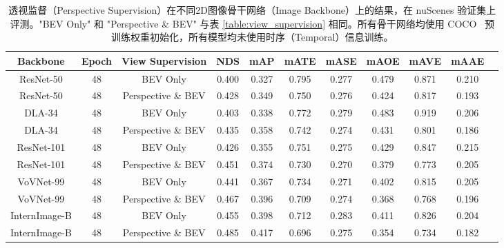 \setlength{\tabcolsep}{3pt}
\setlength{\doublerulesep}{2\arrayrulewidth}
\renewcommand{\arraystretch}{1.1}
\begin{table}[ht]
    \caption{透视监督（Perspective Supervision）在不同2D图像骨干网络（Image Backbone）上的结果，在 nuScenes 验证集上评测。"BEV Only" 和 "Perspective \& BEV" 与表 \ref{table:view_supervision} 相同。所有骨干网络均使用 COCO~\cite{COCO} 预训练权重初始化，所有模型均未使用时序（Temporal）信息训练。}
    \label{table:large_backbone}
    \centering

    \begin{tabular}{c|c|c|cc|cccccc}
        \toprule
        Backbone & Epoch & View Supervision & NDS & mAP & mATE & mASE & mAOE & mAVE & mAAE   \\ 
        \midrule
        ResNet-50 & 48 & BEV Only & 0.400 & 0.327 & 0.795 & 0.277 & 0.479 &0.871 & 0.210 \\ 
        ResNet-50 & 48 & Perspective \& BEV & 0.428 & 0.349 & 0.750 & 0.276 & 0.424 & 0.817 & 0.193 \\
        \midrule
        DLA-34 & 48 & BEV Only & 0.403 & 0.338 & 0.772 & 0.279 & 0.483 & 0.919 & 0.206 \\ 
        DLA-34 & 48 & Perspective \& BEV & 0.435 & 0.358 & 0.742 & 0.274 & 0.431 & 0.801 & 0.186 \\  
  
        \midrule
        ResNet-101 & 48 & BEV Only & 0.426 & 0.355 & 0.751 & 0.275 & 0.429 & 0.847 & 0.215  \\ 
        ResNet-101 & 48 & Perspective \& BEV & 0.451 & 0.374 & 0.730 & 0.270 & 0.379 & 0.773 & 0.205  \\   
        \midrule
        VoVNet-99 & 48 & BEV Only & 0.441 & 0.367  & 0.734 & 0.271 & 0.402 & 0.815  & 0.205 \\ 
        VoVNet-99 & 48 & Perspective \& BEV & 0.467 & 0.396  & 0.709  & 0.274 & 0.368 & 0.768 & 0.196 \\ 
        \midrule
        InternImage-B & 48 & BEV Only & 0.455 & 0.398  & 0.712 & 0.283 & 0.411 & 0.826  & 0.204 \\ 
        InternImage-B & 48 & Perspective \& BEV & 0.485 & 0.417  & 0.696  & 0.275 & 0.354 & 0.734 & 0.182 \\ 
        \bottomrule
    \end{tabular}
    
\end{table}